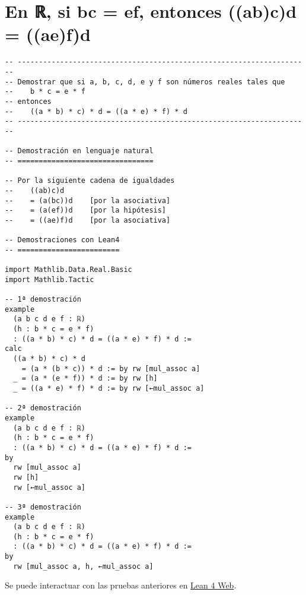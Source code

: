 \section{En ℝ, si bc = ef, entonces ((ab)c)d = ((ae)f)d}
\label{sec:org9ff6f4f}
\begin{verbatim}
-- ---------------------------------------------------------------------
-- Demostrar que si a, b, c, d, e y f son números reales tales que
--    b * c = e * f
-- entonces
--    ((a * b) * c) * d = ((a * e) * f) * d
-- ---------------------------------------------------------------------

-- Demostración en lenguaje natural
-- ================================

-- Por la siguiente cadena de igualdades
--    ((ab)c)d
--    = (a(bc))d    [por la asociativa]
--    = (a(ef))d    [por la hipótesis]
--    = ((ae)f)d    [por la asociativa]

-- Demostraciones con Lean4
-- ========================

import Mathlib.Data.Real.Basic
import Mathlib.Tactic

-- 1ª demostración
example
  (a b c d e f : ℝ)
  (h : b * c = e * f)
  : ((a * b) * c) * d = ((a * e) * f) * d :=
calc
  ((a * b) * c) * d
    = (a * (b * c)) * d := by rw [mul_assoc a]
  _ = (a * (e * f)) * d := by rw [h]
  _ = ((a * e) * f) * d := by rw [←mul_assoc a]

-- 2ª demostración
example
  (a b c d e f : ℝ)
  (h : b * c = e * f)
  : ((a * b) * c) * d = ((a * e) * f) * d :=
by
  rw [mul_assoc a]
  rw [h]
  rw [←mul_assoc a]

-- 3ª demostración
example
  (a b c d e f : ℝ)
  (h : b * c = e * f)
  : ((a * b) * c) * d = ((a * e) * f) * d :=
by
  rw [mul_assoc a, h, ←mul_assoc a]
\end{verbatim}
Se puede interactuar con las pruebas anteriores en \href{https://lean.math.hhu.de/\#url=https://raw.githubusercontent.com/jaalonso/Calculemus2/main/src/Si\_bc\_eq\_ef\_entonces\_((ab)c)d\_eq\_((ae)f)d.lean}{Lean 4 Web}.

